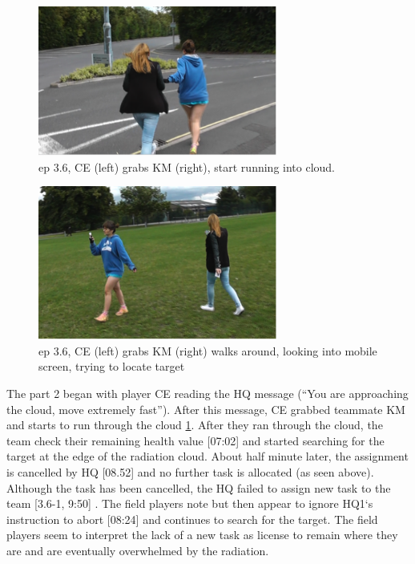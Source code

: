 \begin{figure}[h]
\centering

\includegraphics[width=0.7\textwidth]{img/study3/ep361}
\caption{ep 3.6, CE (left) grabs KM (right), start running into cloud. }
\label{fig:ep361}
\end{figure}

\begin{figure}[h]
\centering
 \includegraphics[width=0.7\textwidth]{img/study3/ep362}
\caption{ep 3.6, CE (left) grabs KM (right) walks around, looking into mobile screen, trying to locate target}
\label{fig:ep362}

\end{figure}

The part 2 began with player CE reading the HQ message (``You are approaching the cloud, move extremely fast''). After this message, CE grabbed teammate KM and starts to run through the cloud \ref{fig:ep361}.  After they ran through the cloud, the team check their remaining health value [07:02] and started searching for the target at the edge of the radiation cloud. About half minute later, the assignment is cancelled by HQ [08.52] and no further task is allocated (as seen above). Although the task has been cancelled, the HQ failed to assign new task to the team [3.6-1, 9:50] . The field players note but then appear to ignore HQ1`s instruction to abort [08:24] and continues to search for the target. The field players seem to interpret the lack of a new task as license to remain where they are and are eventually overwhelmed by the radiation.\\

